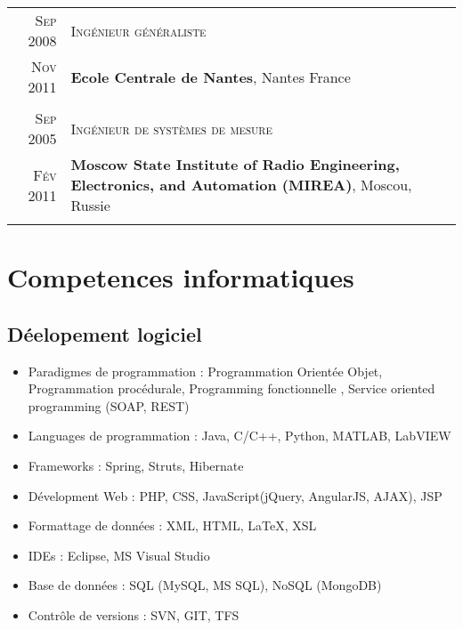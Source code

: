 \documentclass[letter,10pt]{article} %
\begin{document}
\begin{tabular}{r|p{12cm}}


\textsc{Sep 2008} & \textsc{Ing\'{e}nieur g\'{e}n\'{e}raliste} \\ 
\textsc{Nov 2011} & \normalsize\textbf{Ecole Centrale de Nantes}, Nantes France\\
&\\


\textsc{Sep 2005} & \textsc{Ing\'{e}nieur de syst\`{e}mes de mesure} \\ 
\textsc{F\'{e}v 2011} &  \normalsize\textbf{Moscow State Institute of Radio Engineering, Electronics, and Automation (MIREA)}, Moscou, Russie\\
&\\
\end{tabular}



\section{Competences informatiques}

\subsection*{D\'{e}elopement logiciel}
\begin{itemize}
  \item Paradigmes de programmation : Programmation Orient\'{e}e Objet,
  Programmation proc\'{e}durale, Programming fonctionnelle , Service oriented
  programming (SOAP, REST)
  \item Languages de programmation : Java, C/C++, Python,
  MATLAB, LabVIEW
  \item Frameworks : Spring, Struts, Hibernate
  \item D\'{e}velopment Web : PHP, CSS, JavaScript(jQuery, AngularJS, AJAX), JSP
  \item Formattage de donn\'{e}es : XML, HTML, LaTeX, XSL
  \item IDEs : Eclipse, MS Visual Studio
  \item Base de donn\'{e}es : SQL (MySQL, MS SQL), NoSQL (MongoDB)
  \item Contr\^{o}le de versions : SVN, GIT, TFS
\end{itemize}
\end{document}
